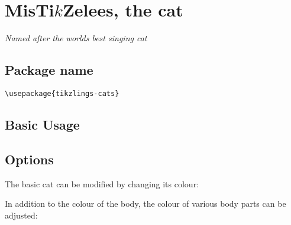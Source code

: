 \documentclass[parskip=half]{scrartcl}
\begin{document}
%
%
\clearpage
\section[Cat]{MisTi$k$Zelees, the cat}

\emph{Named after the worlds best singing cat}

\subsection{Package name}

\begin{tcolorbox}[lower separated=false, lefthand width=.8\linewidth]
\vspace*{0.5cm}
\lstinline|\usepackage{tikzlings-cats}| 
\vspace*{0.5cm}
\end{tcolorbox}

\subsection{Basic Usage}

\begin{tcblisting}{}
\cat
\end{tcblisting}

\subsection{Options}

The basic cat can be modified by changing its colour:
\begin{tcblisting}{}
\cat[body=blue]
\end{tcblisting}

In addition to the colour of the body, the colour of various body parts can be adjusted:
\begin{tcblisting}{}
\cat[eye=green]
\end{tcblisting}
\begin{tcblisting}{}
\cat[pupil=red]
\end{tcblisting}
\begin{tcblisting}{}
\cat[nose=red]
\end{tcblisting}
\begin{tcblisting}{}
\cat[whiskers=red]
\end{tcblisting}
\begin{tcblisting}{}
\cat[paws=red]
\end{tcblisting}
\end{document}
